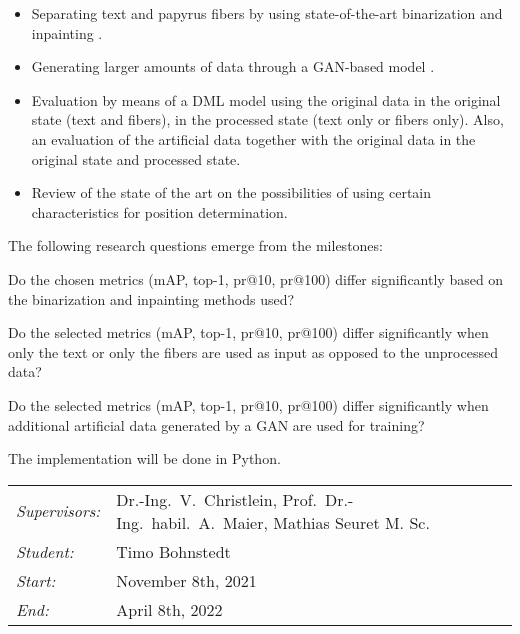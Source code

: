 \documentclass[12pt,a4paper]{article}
\begin{document}
\begin{itemize}
	\item Separating text and papyrus fibers by using state-of-the-art binarization \cite{Tensmeyer20} and inpainting \cite{Liu18Impainting}.
	
	\item Generating larger amounts of data through a GAN-based model \cite{Goodfellow14, Tamrin21}.
	
	\item  Evaluation by means of a DML model using the original data in the original state (text and fibers), in the processed state (text only or fibers only). Also, an evaluation of the artificial data together with the original data in the original state and processed state.
	
	\item Review of the state of the art on the possibilities of using certain characteristics for position determination.      	      	      
\end{itemize}
		
The following research questions emerge from the milestones:

\begin{questions}
	\item Do the chosen metrics (mAP, top-1, pr@10, pr@100) differ significantly based on the binarization and inpainting methods used?
	
	\item  Do the selected metrics (mAP, top-1, pr@10, pr@100) differ significantly when only the text or only the fibers are used as input as opposed to the unprocessed data?  
	
	\item  Do the selected metrics (mAP, top-1, pr@10, pr@100) differ significantly when additional artificial data generated by a GAN are used for training?
\end{questions}

		
The implementation will be done in Python.\\
		
\begin{tabular}{ll}
	\emph{Supervisors:} & Dr.-Ing.~V.~Christlein,  Prof.~Dr.-Ing.~habil.~A.~Maier, Mathias Seuret M. Sc.
	\\
	\emph{Student:}     & Timo Bohnstedt
	\\
	\emph{Start:}       & November 8th, 2021                                            \\
	\emph{End:}         & April 8th, 2022                                        \\
\end{tabular}
\nopagebreak[4]
\small


		
\end{document}
